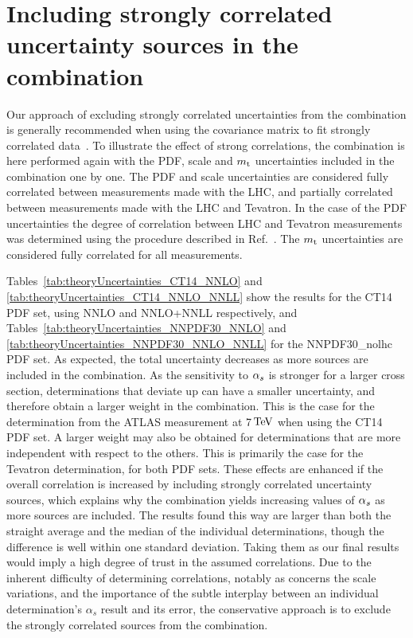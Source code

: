 \section{Including strongly correlated uncertainty sources in the combination}
\label{sec:appendix}

Our approach of excluding strongly correlated uncertainties from the combination is generally recommended when using the covariance matrix to fit strongly correlated data~\cite{DAgostini:1993arp}.
% 
To illustrate the effect of strong correlations, the combination is here performed again with the PDF, scale and $m_\mathrm{t}$ uncertainties included in the combination one by one.
% 
The PDF and scale uncertainties are considered fully correlated between measurements made with the LHC, and partially correlated between measurements made with the LHC and Tevatron.
% 
In the case of the PDF uncertainties the degree of correlation between LHC and Tevatron measurements was determined using the procedure described in Ref.~\cite{LHAPDF}.
%
The $m_\mathrm{t}$ uncertainties are considered fully correlated for all measurements.
% 

Tables~\ref{tab:theoryUncertainties_CT14_NNLO} and \ref{tab:theoryUncertainties_CT14_NNLO_NNLL} show the results for the CT14 PDF set, using NNLO and NNLO+NNLL respectively, and Tables~\ref{tab:theoryUncertainties_NNPDF30_NNLO} and \ref{tab:theoryUncertainties_NNPDF30_NNLO_NNLL} for the NNPDF30\_nolhc PDF set.
% 
As expected, the total uncertainty decreases as more sources are included in the combination.
% 
As the sensitivity to $\alpha_s$ is stronger for a larger cross section, determinations that deviate up can have a smaller uncertainty, and therefore obtain a larger weight in the combination.
% 
This is the case for the determination from the ATLAS measurement at 7$\,\text{TeV}$ when using the CT14 PDF set.
% 
A larger weight may also be obtained for determinations that are more independent with respect to the others. This is primarily the case for the Tevatron determination, for both PDF sets.
% 
These effects are enhanced if the overall correlation is increased by including strongly correlated uncertainty sources, which explains why the combination yields increasing values of $\alpha_s$ as more sources are included.
% 
The results found this way are larger than both the straight average and the median of the individual determinations, though the difference is well within one standard deviation. 
% 
Taking them as our final results would imply a high degree of trust in the assumed correlations.
% 
Due to the inherent difficulty of determining correlations, notably as concerns the scale variations, and the importance of the subtle interplay between an individual determination's $\alpha_s$ result and its error, the conservative approach is to exclude the strongly correlated sources from the combination.
%

